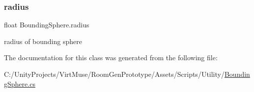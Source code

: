 \mbox{\label{class_bounding_sphere_ad507cd54bc4021617024c2545fe9379c}} 
\subsubsection{\texorpdfstring{radius}{radius}}
{\footnotesize\ttfamily float Bounding\+Sphere.\+radius}



radius of bounding sphere 



The documentation for this class was generated from the following file\+:\begin{DoxyCompactItemize}
\item 
C\+:/\+Unity\+Projects/\+Virt\+Muse/\+Room\+Gen\+Prototype/\+Assets/\+Scripts/\+Utility/\mbox{\hyperlink{_bounding_sphere_8cs}{Bounding\+Sphere.\+cs}}\end{DoxyCompactItemize}

